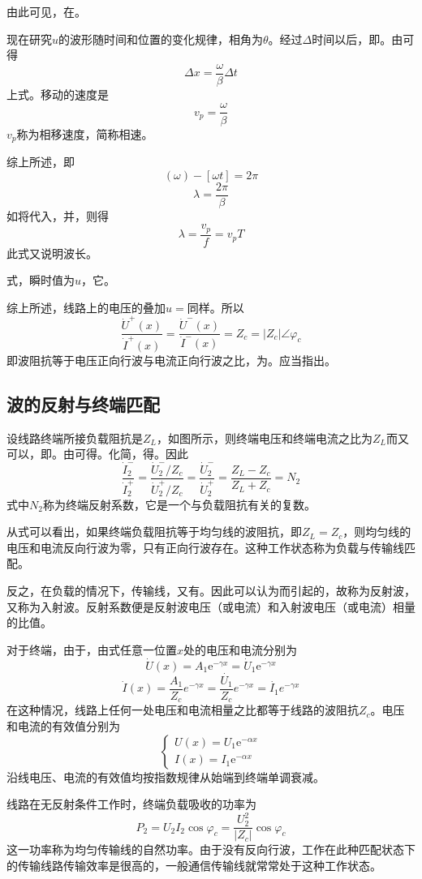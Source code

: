 由此可见，在。

现在研究$u$的波形随时间和位置的变化规律，相角为$\theta$。经过$\Delta$时间以后，即。由可得
\[
\Delta x=\frac{\omega}{\beta}\Delta t
\]
上式。移动的速度是
\[
v_p=\frac{\omega}{\beta}
\]
$v_p$称为相移速度，简称相速。

综上所述，即
\[
(\omega)-[\omega t]=2\pi
\]
\[
\lambda=\frac{2\pi}{\beta}
\]
如将代入，并，则得
\[
\lambda=\frac{v_p}{f}=v_pT
\]
此式又说明波长。

式，瞬时值为$u$，它。

综上所述，线路上的电压的叠加$u$$=$同样。所以
\[
\frac{\dot{U}^{+}(x)}{\dot{I}^{+}(x)}=\frac{\dot{U}^{-}(x)}{\dot{I}^{-}(x)}=Z_{c}=\vert Z_{c}\vert\angle\varphi_{c}
\]
即波阻抗等于电压正向行波与电流正向行波之比，为。应当指出。

\subsection{波的反射与终端匹配}
设线路终端所接负载阻抗是$Z_L$，如图所示，则终端电压和终端电流之比为$Z_L$而又可以，即。由可得。化简，得。因此
\[
\frac{\dot{I}_2^-}{\dot{I}_2^+} = \frac{\dot{U}_2^- / Z_c}{\dot{U}_2^+ / Z_c} = \frac{\dot{U}_2^-}{\dot{U}_2^+} = \frac{Z_L - Z_c}{Z_L + Z_c} = N_2
\]
式中$N_2$称为终端反射系数，它是一个与负载阻抗有关的复数。

从式可以看出，如果终端负载阻抗等于均匀线的波阻抗，即$Z_L=Z_c$，则均匀线的电压和电流反向行波为零，只有正向行波存在。这种工作状态称为负载与传输线匹配。

反之，在负载的情况下，传输线，又有。因此可以认为而引起的，故称为反射波，又称为入射波。反射系数便是反射波电压（或电流）和入射波电压（或电流）相量的比值。

对于终端，由于，由式任意一位置$x$处的电压和电流分别为
\[
\dot{U}(x) = A_1 \mathrm{e}^{-\gamma x} = \dot{U}_1 \mathrm{e}^{-\gamma x}
\]
\[
\dot{I}(x)=\frac{A_1}{Z_c}e^{-\gamma x}=\frac{\dot{U_1}}{Z_c}e^{-\gamma x}=\dot{I_1}e^{-\gamma x}
\]
在这种情况，线路上任何一处电压和电流相量之比都等于线路的波阻抗$Z_c$。电压和电流的有效值分别为
\[
\begin{cases}
U(x) = U_1 \mathrm{e}^{-\alpha x} \\
I(x) = I_1 \mathrm{e}^{-\alpha x}
\end{cases}
\]
沿线电压、电流的有效值均按指数规律从始端到终端单调衰减。

线路在无反射条件工作时，终端负载吸收的功率为
\[
P_2 = U_2 I_2 \cos\varphi_c = \frac{U_2^2}{\vert Z_c \vert} \cos\varphi_c
\]
这一功率称为均匀传输线的自然功率。由于没有反向行波，工作在此种匹配状态下的传输线路传输效率是很高的，一般通信传输线就常常处于这种工作状态。

